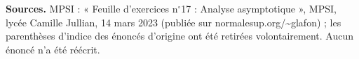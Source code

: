 \documentclass[11pt,a4paper]{article}
\begin{document}
\vfill
\begin{small}
\noindent\textbf{Sources.} MPSI : « Feuille d'exercices n$^{\circ}$17 : Analyse asymptotique », MPSI, lycée Camille Jullian, 14 mars 2023 (publiée sur normalesup.org/\textasciitilde glafon) ; les parenthèses d'indice des énoncés d'origine ont été retirées volontairement. Aucun énoncé n'a été réécrit.
\end{small}
\end{document}
